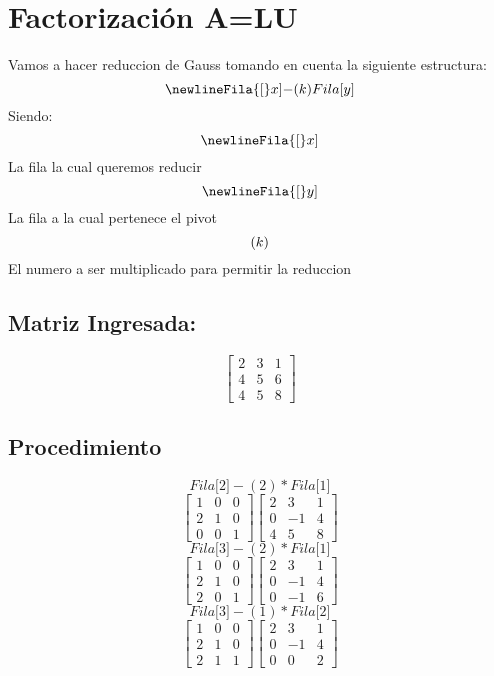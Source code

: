 \documentclass{article}%
\begin{document}
%
\normalsize%
\[%
%
\]%
\section{ Factorización A=LU }%
\label{sec:FactorizacinA=LU}%
Vamos a hacer reduccion de Gauss tomando en cuenta la siguiente estructura:%
\[%
\newline%
Fila{[}x{]}{-}(k)Fila{[}y{]}%
\]%
Siendo:%
\[%
\newline%
Fila{[}x{]}%
\]%
La fila la cual queremos reducir%
\[%
\newline%
Fila{[}y{]}%
\]%
La fila a la cual pertenece el pivot\newline%
%
\[%
\newline%
(k)%
\]%
El numero a ser multiplicado para permitir la reduccion\newline%
%
\subsection{Matriz Ingresada: }%
\label{subsec:MatrizIngresada}%
\[%
\left[\begin{matrix}2 & 3 & 1\\4 & 5 & 6\\4 & 5 & 8\end{matrix}\right]%
\]

%
\subsection{Procedimiento}%
\label{subsec:Procedimiento}%
\[%
Fila{[}2{]}{-}(2)*Fila{[}1{]}%
\]%
\[%
\left[\begin{matrix}1 & 0 & 0\\2 & 1 & 0\\0 & 0 & 1\end{matrix}\right] \left[\begin{matrix}2 & 3 & 1\\0 & -1 & 4\\4 & 5 & 8\end{matrix}\right]%
\]%
\[%
Fila{[}3{]}{-}(2)*Fila{[}1{]}%
\]%
\[%
\left[\begin{matrix}1 & 0 & 0\\2 & 1 & 0\\2 & 0 & 1\end{matrix}\right] \left[\begin{matrix}2 & 3 & 1\\0 & -1 & 4\\0 & -1 & 6\end{matrix}\right]%
\]%
\[%
Fila{[}3{]}{-}(1)*Fila{[}2{]}%
\]%
\[%
\left[\begin{matrix}1 & 0 & 0\\2 & 1 & 0\\2 & 1 & 1\end{matrix}\right] \left[\begin{matrix}2 & 3 & 1\\0 & -1 & 4\\0 & 0 & 2\end{matrix}\right]%
\]
\end{document}
